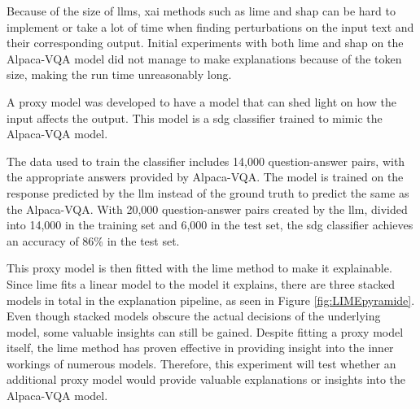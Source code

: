         Because of the size of \glspl{llm}, \gls{xai} methods such as \gls{lime} and \gls{shap} can be hard to implement or take a lot of time when finding perturbations on the input text and their corresponding output. Initial experiments with both \gls{lime} and \gls{shap} on the Alpaca-VQA model did not manage to make explanations because of the token size, making the run time unreasonably long.
        
        
        A proxy model was developed to have a model that can shed light on how the input affects the output. This model is a \gls{sdg} classifier trained to mimic the Alpaca-VQA model. 
        
        The data used to train the classifier includes 14,000 question-answer pairs, with the appropriate answers provided by Alpaca-VQA. The model is trained on the response predicted by the \gls{llm} instead of the ground truth to predict the same as the Alpaca-VQA. With 20,000 question-answer pairs created by the \gls{llm}, divided into 14,000 in the training set and 6,000 in the test set, the \gls{sdg} classifier achieves an accuracy of 86\% in the test set.
        
        This proxy model is then fitted with the \gls{lime} method to make it explainable. Since \gls{lime} fits a linear model to the model it explains, there are three stacked models in total in the explanation pipeline, as seen in Figure \ref{fig:LIMEpyramide}. 
        Even though stacked models obscure the actual decisions of the underlying model, some valuable insights can still be gained. 
        Despite fitting a proxy model itself, the \gls{lime} method has proven effective in providing insight into the inner workings of numerous models. Therefore, this experiment will test whether an additional proxy model would provide valuable explanations or insights into the Alpaca-VQA model. 
         

